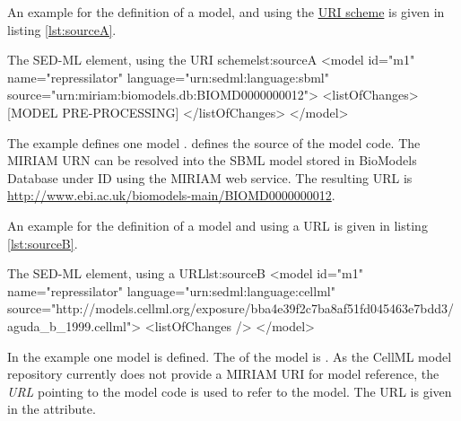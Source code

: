 An example for the definition of a model, and using the  \hyperref[sec:uriScheme]{URI scheme} is given in listing \ref{lst:sourceA}.
%
\begin{myXmlLst}{The SED-ML  element, using the URI scheme}{lst:sourceA}
 <model id="m1" name="repressilator" language="urn:sedml:language:sbml" 
  source="urn:miriam:biomodels.db:BIOMD0000000012">
  <listOfChanges>
   [MODEL PRE-PROCESSING]
  </listOfChanges>
 </model>
\end{myXmlLst}
%
The example defines one model .  defines the source of the model code. The MIRIAM URN can be resolved into the SBML model stored in BioModels Database under ID  using the MIRIAM web service. The resulting URL is \url{http://www.ebi.ac.uk/biomodels-main/BIOMD0000000012}.

An example for the definition of a model and using a URL is given in listing \ref{lst:sourceB}.
%
\begin{myXmlLst}{The SED-ML  element, using a URL}{lst:sourceB}
 <model id="m1" name="repressilator" language="urn:sedml:language:cellml" 
  source="http://models.cellml.org/exposure/bba4e39f2c7ba8af51fd045463e7bdd3/aguda_b_1999.cellml">
  <listOfChanges />
 </model>
\end{myXmlLst}
%
In the example one model is defined. The  of the model is . As the CellML model repository currently does not provide a MIRIAM URI for model reference, the \emph{URL} pointing to the model code is used to refer to the model. The URL is given in the  attribute.

